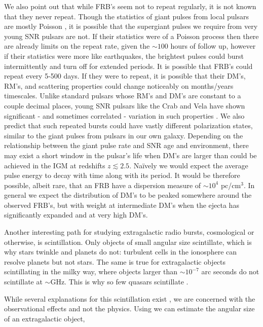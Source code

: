 \documentclass[useAMS,usenatbib]{mn2e}
\begin{document}
We also point out that while FRB's seem not to repeat regularly, 
it is not known that they never repeat. Though the statistics 
of giant pulses from local pulsars are mostly Poisson \citep{1999ApJ...517..460S},
it is possible that 
the supergiant pulses we require from very young SNR pulsars are not. If their 
statistics were of a Poisson process then there are already limits on the repeat rate, 
given the $\sim100$ hours of follow up, however if their statistics were more like
earthquakes, the brightest pulses could burst intermittently and turn off
for extended periods. It is possible that FRB's could repeat every 5-500 days. 
If they were to repeat,
it is possible that their DM's, RM's, and scattering properties could 
change noticeably on months/years timescales. Unlike standard pulsars 
whose RM's and DM's are constant to a couple decimal places, young 
SNR pulsars like the Crab and Vela have shown significant - and sometimes
correlated - variation in such properties \citep{1988A&A...202..166R, 2008A&A...483...13K}.
We also predict that such repeated 
bursts could have vastly different polarization states, similar to the giant 
pulses from pulsars in our own galaxy. 
Depending on the relationship between the giant pulse rate and SNR
age and environment, there may exist a short window in the pulsar's life when 
DM's are larger than could be achieved in the IGM at redshifts $z\lesssim2.5$. 
Na\"ively we would expect the average pulse 
energy to decay with time along with its period. 
It would be therefore possible, albeit rare, that an FRB have a dispersion 
measure of $\sim10^4$ pc/cm$^3$. In general we expect the distribution of DM's 
to be peaked somewhere around the observed FRB's, but with weight at intermediate 
DM's when the ejecta has significantly expanded and at very high DM's.  
 
Another interesting path for studying extragalactic radio bursts, 
cosmological or otherwise, is scintillation. Only objects of small angular
size scintillate, which is why stars twinkle and planets do not: turbulent cells
in the ionosphere can resolve planets but not stars. The same is true for extragalactic
objects scintillating in the milky way, where objects larger than $\sim10^{-7}$ 
arc seconds do not scintillate at $\sim$GHz. 
This is why so few quasars scintillate \citep{2002Natur.415...57D}. 

While several explanations for this scintillation exist 
\citep{1992RSPTA.341..151N, 2014MNRAS.442.3338P}, we are  
concerned with the observational effects and not the physics. 
Using \cite{1986isra.book.....T} 
we can estimate the angular size of an extragalactic object,
\end{document}
